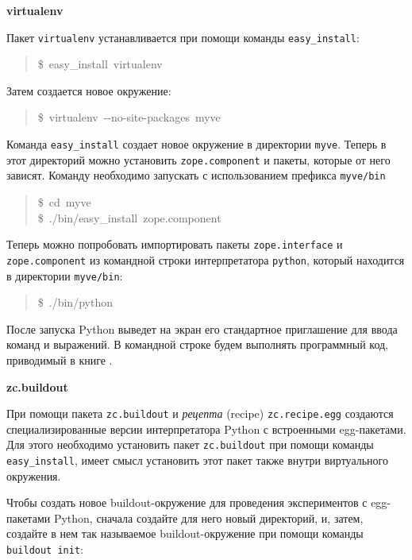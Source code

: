 \documentclass[14pt,a4paper,openany,twoside,final]{extbook}
\providecommand*{\DUroletitlereference}[1]{\textsl{#1}}
\begin{document}
\textbf{virtualenv}

Пакет \texttt{virtualenv} устанавливается при помощи команды
\texttt{easy\_install}:

\begin{quote}{\ttfamily \raggedright \noindent
\$~easy\_install~virtualenv
}
\end{quote}

Затем создается новое окружение:

\begin{quote}{\ttfamily \raggedright \noindent
\$~virtualenv~-{}-no-site-packages~myve
}
\end{quote}

Команда \texttt{easy\_install} создает новое окружение в директории
\texttt{myve}.  Теперь в этот директорий можно установить
\texttt{zope.component} и пакеты, которые от него зависят.  Команду
необходимо запускать с использованием префикса \texttt{myve/bin}

\begin{quote}{\ttfamily \raggedright \noindent
\$~cd~myve\\
\$~./bin/easy\_install~zope.component
}
\end{quote}

Теперь можно попробовать импортировать пакеты \texttt{zope.interface} и
\texttt{zope.component} из командной строки интерпретатора \texttt{python}, который
находится в директории \texttt{myve/bin}:

\begin{quote}{\ttfamily \raggedright \noindent
\$~./bin/python
}
\end{quote}

После запуска Python выведет на экран его стандартное приглашение для
ввода команд и выражений.  В командной строке будем выполнять
программный код, приводимый в книге .

\textbf{zc.buildout}

При помощи пакета \texttt{zc.buildout} и \DUroletitlereference{рецепта} (recipe)
\texttt{zc.recipe.egg} создаются специализированные версии интерпретатора
Python с встроенными egg-пакетами.  Для этого необходимо установить
пакет \texttt{zc.buildout} при помощи команды \texttt{easy\_install}, имеет смысл
установить этот пакет также внутри виртуального окружения.

Чтобы создать новое buildout-окружение для проведения экспериментов с
egg-пакетами Python, сначала создайте для него новый директорий, и,
затем, создайте в нем так называемое buildout-окружение при помощи
команды \texttt{buildout init}:
\end{document}
